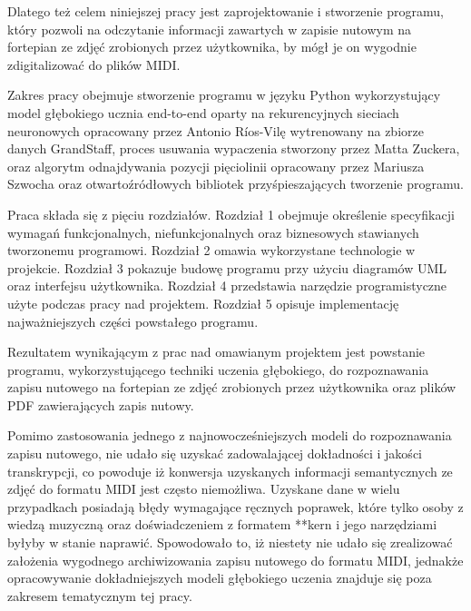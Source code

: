 \documentclass[xodstep]{wnspt}
\begin{document}
Dlatego też celem niniejszej pracy jest zaprojektowanie i stworzenie programu, który pozwoli na odczytanie informacji zawartych w zapisie nutowym na fortepian ze zdjęć zrobionych przez użytkownika, by mógł je on wygodnie zdigitalizować do plików MIDI. 

Zakres pracy obejmuje stworzenie programu w języku Python wykorzystujący model głębokiego ucznia end-to-end oparty na rekurencyjnych sieciach neuronowych opracowany przez Antonio Ríos-Vilę wytrenowany na zbiorze danych GrandStaff\cite{Rios-Vila2023}, proces usuwania wypaczenia stworzony przez Matta Zuckera, oraz algorytm odnajdywania pozycji pięciolinii opracowany przez Mariusza Szwocha \cite{Szwoch2005} oraz otwartoźródłowych bibliotek przyśpieszających tworzenie programu.

Praca składa się z pięciu rozdziałów. Rozdział 1 obejmuje określenie specyfikacji wymagań funkcjonalnych, niefunkcjonalnych oraz biznesowych stawianych tworzonemu programowi. Rozdział 2 omawia wykorzystane technologie w projekcie. Rozdział 3 pokazuje budowę programu przy użyciu diagramów UML oraz interfejsu użytkownika. Rozdział 4 przedstawia narzędzie programistyczne użyte podczas pracy nad projektem. Rozdział 5 opisuje implementację najważniejszych części powstałego programu.








\summary

Rezultatem wynikającym z prac nad omawianym projektem jest powstanie programu, wykorzystującego techniki uczenia głębokiego, do rozpoznawania zapisu nutowego na fortepian ze zdjęć zrobionych przez użytkownika oraz plików PDF zawierających zapis nutowy.

Pomimo zastosowania jednego z najnowocześniejszych modeli do rozpoznawania zapisu nutowego, nie udało się uzyskać zadowalającej dokładności i jakości transkrypcji, co powoduje iż konwersja uzyskanych informacji semantycznych ze zdjęć do formatu MIDI jest często niemożliwa. Uzyskane dane w wielu przypadkach posiadają błędy wymagające ręcznych poprawek, które tylko osoby z wiedzą muzyczną oraz doświadczeniem z formatem **kern i jego narzędziami byłyby w stanie naprawić. Spowodowało to, iż niestety nie udało się zrealizować założenia wygodnego archiwizowania zapisu nutowego do formatu MIDI, jednakże opracowywanie dokładniejszych modeli głębokiego uczenia znajduje się poza zakresem tematycznym tej pracy.
\end{document}
